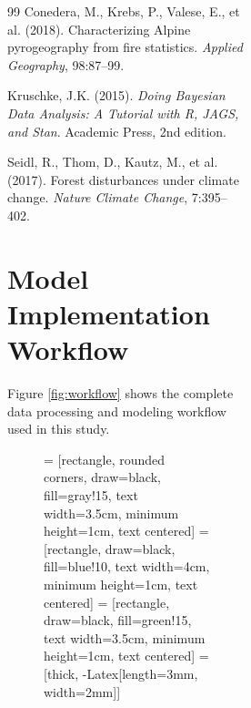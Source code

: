 \documentclass[11pt,a4paper]{article}
\begin{document}
\begin{figure}[H]
\begin{figure}[H]
\begin{figure}[H]
\begin{thebibliography}{99}
Conedera, M., Krebs, P., Valese, E., et al. (2018).
\newblock Characterizing Alpine pyrogeography from fire statistics.
\newblock \textit{Applied Geography}, 98:87--99.

Kruschke, J.K. (2015).
\newblock \textit{Doing Bayesian Data Analysis: A Tutorial with R, JAGS, and Stan}.
\newblock Academic Press, 2nd edition.

Seidl, R., Thom, D., Kautz, M., et al. (2017).
\newblock Forest disturbances under climate change.
\newblock \textit{Nature Climate Change}, 7:395--402.

\end{thebibliography}

\appendix

\section{Model Implementation Workflow}

Figure \ref{fig:workflow} shows the complete data processing and modeling workflow used in this study.

\begin{figure}[H]
\centering
{} = [rectangle, rounded corners, draw=black, fill=gray!15,
                    text width=3.5cm, minimum height=1cm, text centered]
 = [rectangle, draw=black, fill=blue!10,
                       text width=4cm, minimum height=1cm, text centered]
 = [rectangle, draw=black, fill=green!15,
                      text width=3.5cm, minimum height=1cm, text centered]
 = [thick, -{Latex[length=3mm, width=2mm]}]

\end{figure}
\end{figure}
\end{figure}
\end{figure}
\end{document}
